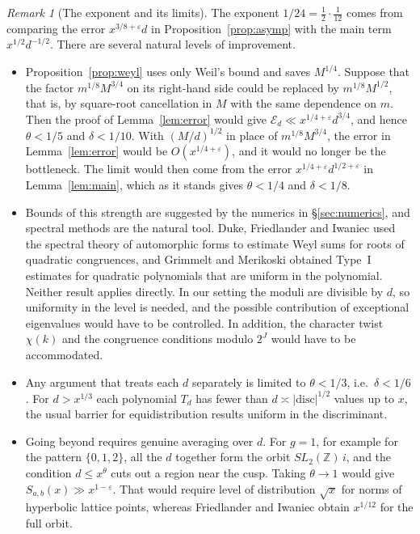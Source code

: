 \documentclass[11pt]{amsart}
\theoremstyle{remark}
\newtheorem{remark}[theorem]{Remark}
\theoremstyle{definition}
\numberwithin{equation}{section}
\newcommand{\Z}{\mathbb{Z}}
\newcommand{\eps}{\varepsilon}
\begin{document}
\begin{remark}[The exponent and its limits]\label{rem:exponent}
The exponent $1/24=\frac12\cdot\frac1{12}$ comes from comparing the error $x^{3/8+\eps}d$ in Proposition~\ref{prop:asymp} with the main term $x^{1/2}d^{-1/2}$. There are several natural levels of improvement.
\begin{itemize}
\item Proposition~\ref{prop:weyl} uses only Weil's bound and saves $M^{1/4}$. Suppose that the factor $m^{1/8}M^{3/4}$ on its right-hand side could be replaced by $m^{1/8}M^{1/2}$, that is, by square-root cancellation in $M$ with the same dependence on $m$. Then the proof of Lemma~\ref{lem:error} would give $\mathcal E_d\ll x^{1/4+\eps}d^{3/4}$, and hence $\theta<1/5$ and $\delta<1/10$. With $(M/d)^{1/2}$ in place of $m^{1/8}M^{3/4}$, the error in Lemma~\ref{lem:error} would be $O(x^{1/4+\eps})$, and it would no longer be the bottleneck. The limit would then come from the error $x^{1/4+\eps}d^{1/2+\eps}$ in Lemma~\ref{lem:main}, which as it stands gives $\theta<1/4$ and $\delta<1/8$.
\item Bounds of this strength are suggested by the numerics in \S\ref{sec:numerics}, and spectral methods are the natural tool. Duke, Friedlander and Iwaniec \cite{DFI} used the spectral theory of automorphic forms to estimate Weyl sums for roots of quadratic congruences, and Grimmelt and Merikoski \cite{GM} obtained Type~I estimates for quadratic polynomials that are uniform in the polynomial. Neither result applies directly. In our setting the moduli are divisible by $d$, so uniformity in the level is needed, and the possible contribution of exceptional eigenvalues would have to be controlled. In addition, the character twist $\chi(k)$ and the congruence conditions modulo $2^J$ would have to be accommodated.
\item Any argument that treats each $d$ separately is limited to $\theta<1/3$, i.e.\ $\delta<1/6$. For $d>x^{1/3}$ each polynomial $T_d$ has fewer than $d\asymp|\mathrm{disc}|^{1/2}$ values up to $x$, the usual barrier for equidistribution results uniform in the discriminant.
\item Going beyond requires genuine averaging over $d$. For $g=1$, for example for the pattern $\{0,1,2\}$, all the $d$ together form the orbit $SL_2(\Z)\,i$, and the condition $d\le x^{\theta}$ cuts out a region near the cusp. Taking $\theta\to1$ would give $S_{a,b}(x)\gg x^{1-\eps}$. That would require level of distribution $\sqrt x$ for norms of hyperbolic lattice points, whereas Friedlander and Iwaniec \cite{FI09} obtain $x^{1/12}$ for the full orbit.
\end{itemize}
\end{remark}
\end{document}
